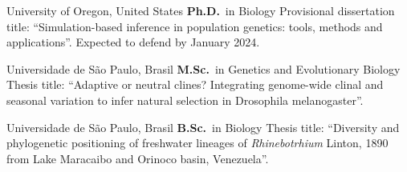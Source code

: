 	{%
		University of Oregon, United States
    }
	{%
		\textbf{Ph.D.}~in Biology
    }
	{%
        Provisional dissertation title: ``Simulation-based inference in population genetics: tools, methods and applications''. Expected to defend by January 2024.
    }

		{%
			Universidade de São Paulo, Brasil
        }
		{%
			\textbf{M.Sc.}~in Genetics and Evolutionary Biology
        }
		{%
		Thesis title: ``Adaptive or neutral clines? Integrating genome-wide clinal and seasonal variation to infer natural selection in Drosophila melanogaster''.
        }

		{%
			Universidade de São Paulo, Brasil
        }
		{%
			\textbf{B.Sc.}~in Biology
        }
		{%
		Thesis title: ``Diversity and phylogenetic positioning of freshwater lineages of \textit{Rhinebotrhium} Linton, 1890 from Lake Maracaibo and Orinoco basin, Venezuela''. 
        }
